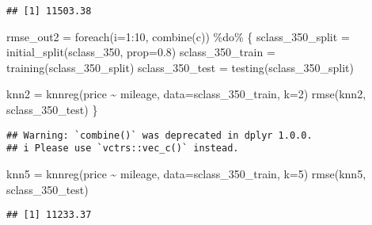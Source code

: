 \documentclass[
]{article}
\newenvironment{Shaded}{\begin{snugshade}}{\end{snugshade}}
\newcommand{\AttributeTok}[1]{\textcolor[rgb]{0.77,0.63,0.00}{#1}}
\newcommand{\DecValTok}[1]{\textcolor[rgb]{0.00,0.00,0.81}{#1}}
\newcommand{\FloatTok}[1]{\textcolor[rgb]{0.00,0.00,0.81}{#1}}
\newcommand{\FunctionTok}[1]{\textcolor[rgb]{0.00,0.00,0.00}{#1}}
\newcommand{\NormalTok}[1]{#1}
\newcommand{\OtherTok}[1]{\textcolor[rgb]{0.56,0.35,0.01}{#1}}
\newcommand{\SpecialCharTok}[1]{\textcolor[rgb]{0.00,0.00,0.00}{#1}}
\newcommand{\StringTok}[1]{\textcolor[rgb]{0.31,0.60,0.02}{#1}}
\begin{document}
\begin{verbatim}
## [1] 11503.38
\end{verbatim}

\begin{Shaded}
\begin{Highlighting}[]
\NormalTok{rmse\_out2 }\OtherTok{=} \FunctionTok{foreach}\NormalTok{(}\AttributeTok{i=}\DecValTok{1}\SpecialCharTok{:}\DecValTok{10}\NormalTok{, }\FunctionTok{combine}\NormalTok{(}\StringTok{\textquotesingle{}c\textquotesingle{}}\NormalTok{)) }\SpecialCharTok{\%do\%}\NormalTok{ \{}
\NormalTok{  sclass\_350\_split }\OtherTok{=} \FunctionTok{initial\_split}\NormalTok{(sclass\_350, }\AttributeTok{prop=}\FloatTok{0.8}\NormalTok{)}
\NormalTok{  sclass\_350\_train }\OtherTok{=} \FunctionTok{training}\NormalTok{(sclass\_350\_split)}
\NormalTok{  sclass\_350\_test }\OtherTok{=} \FunctionTok{testing}\NormalTok{(sclass\_350\_split)}
  
\NormalTok{  knn2 }\OtherTok{=} \FunctionTok{knnreg}\NormalTok{(price }\SpecialCharTok{\textasciitilde{}}\NormalTok{ mileage, }\AttributeTok{data=}\NormalTok{sclass\_350\_train, }\AttributeTok{k=}\DecValTok{2}\NormalTok{)}
  \FunctionTok{rmse}\NormalTok{(knn2, sclass\_350\_test)}
\NormalTok{\}}
\end{Highlighting}
\end{Shaded}

\begin{verbatim}
## Warning: `combine()` was deprecated in dplyr 1.0.0.
## i Please use `vctrs::vec_c()` instead.
\end{verbatim}

\begin{Shaded}
\begin{Highlighting}[]
\NormalTok{knn5 }\OtherTok{=} \FunctionTok{knnreg}\NormalTok{(price }\SpecialCharTok{\textasciitilde{}}\NormalTok{ mileage, }\AttributeTok{data=}\NormalTok{sclass\_350\_train, }\AttributeTok{k=}\DecValTok{5}\NormalTok{)}
\FunctionTok{rmse}\NormalTok{(knn5, sclass\_350\_test)}
\end{Highlighting}
\end{Shaded}

\begin{verbatim}
## [1] 11233.37
\end{verbatim}
\end{document}
